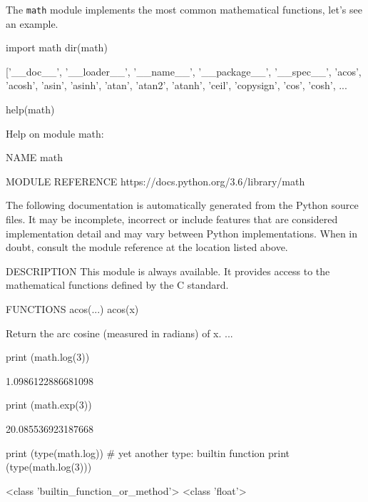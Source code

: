 The \texttt{math} module implements the most common mathematical functions, let's see an example. 

\begin{ipython}
import math
dir(math)
\end{ipython}
\begin{ioutput}
['\_\_doc\_\_',
 '\_\_loader\_\_',
 '\_\_name\_\_',
 '\_\_package\_\_',
 '\_\_spec\_\_',
 'acos',
 'acosh',
 'asin',
 'asinh',
 'atan',
 'atan2',
 'atanh',
 'ceil',
 'copysign',
 'cos',
 'cosh',
...	
\end{ioutput}

\begin{ipython}
help(math)
\end{ipython}
\begin{ioutput}
Help on module math:

NAME
math

MODULE REFERENCE
https://docs.python.org/3.6/library/math

The following documentation is automatically generated from the Python
source files.  It may be incomplete, incorrect or include features that
are considered implementation detail and may vary between Python
implementations.  When in doubt, consult the module reference at the
location listed above.

DESCRIPTION
This module is always available.  It provides access to the
mathematical functions defined by the C standard.

FUNCTIONS
acos(...)
acos(x)

Return the arc cosine (measured in radians) of x.
...
\end{ioutput}

\begin{ipython}
print (math.log(3))
\end{ipython}
\begin{ioutput}
1.0986122886681098	
\end{ioutput}

\begin{ipython}
print (math.exp(3))
\end{ipython}
\begin{ioutput}
20.085536923187668	
\end{ioutput}

\begin{ipython}
print (type(math.log)) # yet another type: builtin function
print (type(math.log(3)))
\end{ipython}
\begin{ioutput}
<class 'builtin\_function\_or\_method'>
<class 'float'>	
\end{ioutput}

